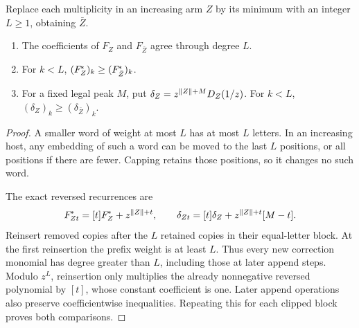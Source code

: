 \begin{lemma}\label{lem:capping}
Replace each multiplicity in an increasing arm $Z$ by its minimum with an integer $L\ge1$, obtaining $\bar Z$.
\begin{enumerate}
\item The coefficients of $F_Z$ and $F_{\bar Z}$ agree through degree $L$.
\item For $k<L$, $(F_Z^{\!*})_k\ge(F_{\bar Z}^{\!*})_k$.
\item For a fixed legal peak $M$, put $\delta_Z=z^{\lVert Z\rVert+M}D_Z(1/z)$. For $k<L$, $(\delta_Z)_k\ge(\delta_{\bar Z})_k$.
\end{enumerate}
\end{lemma}
\begin{proof}
A smaller word of weight at most $L$ has at most $L$ letters. In an increasing host, any embedding of such a word can be moved to the last $L$ positions, or all positions if there are fewer. Capping retains those positions, so it changes no such word.

The exact reversed recurrences are
\begin{equation}\label{eq:reverseappend}
 F_{Zt}^{\!*}=[t]F_Z^{\!*}+z^{\lVert Z\rVert+t},\qquad
 \delta_{Zt}=[t]\delta_Z+z^{\lVert Z\rVert+t}[M-t].
\end{equation}
Reinsert removed copies after the $L$ retained copies in their equal-letter block. At the first reinsertion the prefix weight is at least $L$. Thus every new correction monomial has degree greater than $L$, including those at later append steps. Modulo $z^L$, reinsertion only multiplies the already nonnegative reversed polynomial by $[t]$, whose constant coefficient is one. Later append operations also preserve coefficientwise inequalities. Repeating this for each clipped block proves both comparisons.
\end{proof}

